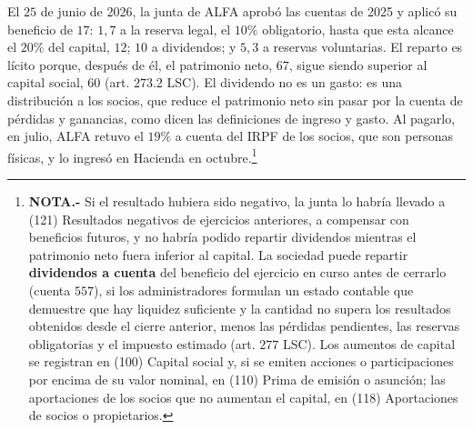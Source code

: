 \documentclass[10pt,a4paper]{article}
\begin{document}
El $25$ de junio de 2026, la junta de ALFA aprobó las cuentas de 2025 y aplicó su beneficio de $17$: $1,7$ a la reserva legal, el $10\%$ obligatorio, hasta que esta alcance el $20\%$ del capital, $12$; $10$ a dividendos; y $5,3$ a reservas voluntarias. El reparto es lícito porque, después de él, el patrimonio neto, $67$, sigue siendo superior al capital social, $60$ (art. $273$.2 LSC). El dividendo no es un gasto: es una distribución a los socios, que reduce el patrimonio neto sin pasar por la cuenta de pérdidas y ganancias, como dicen las definiciones de ingreso y gasto. Al pagarlo, en julio, ALFA retuvo el $19\%$ a cuenta del IRPF de los socios, que son personas físicas, y lo ingresó en Hacienda en octubre.\footnote{%
    \textbf{NOTA.-} Si el resultado hubiera sido negativo, la junta lo habría llevado a (121) Resultados negativos de ejercicios anteriores, a compensar con beneficios futuros, y no habría podido repartir dividendos mientras el patrimonio neto fuera inferior al capital. La sociedad puede repartir \textbf{dividendos a cuenta} del beneficio del ejercicio en curso antes de cerrarlo (cuenta $557$), si los administradores formulan un estado contable que demuestre que hay liquidez suficiente y la cantidad no supera los resultados obtenidos desde el cierre anterior, menos las pérdidas pendientes, las reservas obligatorias y el impuesto estimado (art. $277$ LSC). Los aumentos de capital se registran en (100) Capital social y, si se emiten acciones o participaciones por encima de su valor nominal, en (110) Prima de emisión o asunción; las aportaciones de los socios que no aumentan el capital, en (118) Aportaciones de socios o propietarios.
}
\end{document}
